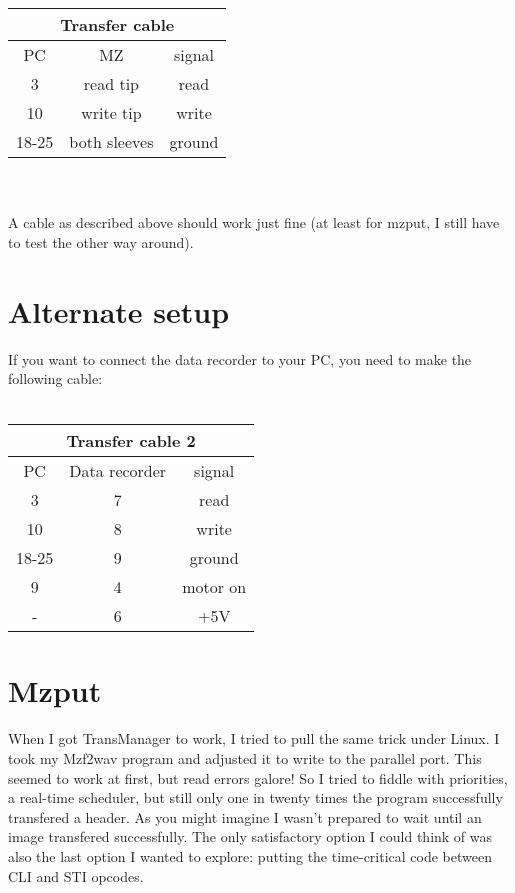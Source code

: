 \begin{tabular}{c|c|c}
\multicolumn{3}{c}{Transfer cable} \\
\hline
PC & MZ & signal \\
\hline
3 & read tip & read \\
10 & write tip & write \\
18-25 & both sleeves & ground \\
\end{tabular} \\ \\
A cable as described above should work just fine (at least for mzput, I still
have to test the other way around).

\section{Alternate setup}
If you want to connect the data recorder to your PC, you need to make the 
following cable: \\ \\
\begin{tabular}{c|c|c}
\multicolumn{3}{c}{Transfer cable 2} \\
\hline
PC & Data recorder & signal \\
\hline
3 & 7 & read \\
10 & 8 & write \\
18-25 & 9 & ground \\
9 & 4 & motor on \\
- & 6 & +5V \\
\end{tabular}

\section{Mzput}
When I got TransManager to work, I tried to pull the same trick under Linux. I
took my Mzf2wav program and adjusted it to write to the parallel port. This 
seemed to work at first, but read errors galore! So I tried to fiddle with 
priorities, a real-time scheduler, but still only one in twenty times the
program successfully transfered a header. As you might imagine I wasn't
prepared to wait until an image transfered successfully. The only satisfactory
option I could think of was also the last option I wanted to explore: putting
the time-critical code between CLI and STI opcodes.

